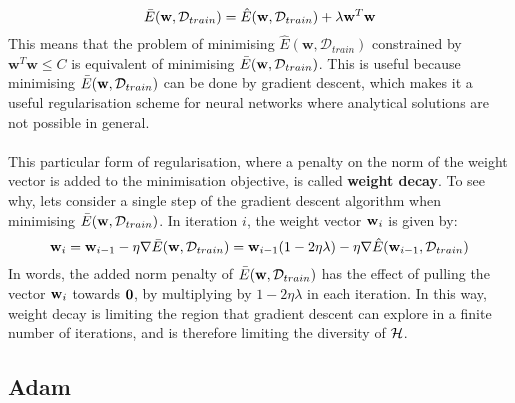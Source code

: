 $$
\bar{E}(\mathbf{w}, \mathcal{D}_{train}) = \hat{E}(\mathbf{w}, \mathcal{D}_{train}) + \lambda\mathbf{w}^T\mathbf{w}
$$
This means that the problem of minimising $\hat{E}(\mathbf{w}, \mathcal{D}_{train})$ constrained by $\mathbf{w}^T\mathbf{w} \leq C$ is equivalent of minimising $\bar{E}(\mathbf{w}, \mathcal{D}_{train})$. This is useful because minimising $\bar{E}(\mathbf{w}, \mathcal{D}_{train})$ can be done by gradient descent, which makes it a useful regularisation scheme for neural networks where analytical solutions are not possible in general.
\\\\
This particular form of regularisation, where a penalty on the norm of the weight vector is added to the minimisation objective, is called \textbf{weight decay}. To see why, lets consider a single step of the gradient descent algorithm when minimising $\bar{E}(\mathbf{w}, \mathcal{D}_{train})$. In iteration $i$, the weight vector $\mathbf{w}_i$ is given by:
$$
\mathbf{w}_i = \mathbf{w}_{i-1} - \eta \nabla \bar{E}(\mathbf{w}, \mathcal{D}_{train}) = \mathbf{w}_{i-1}(1 - 2\eta\lambda) - \eta \nabla \hat{E}(\mathbf{w}_{i-1}, \mathcal{D}_{train})	
$$
In words, the added norm penalty of $\bar{E}(\mathbf{w}, \mathcal{D}_{train})$ has the effect of pulling the vector $\mathbf{w}_i$ towards $\mathbf{0}$, by multiplying by $1 - 2\eta\lambda$ in each iteration. In this way, weight decay is limiting the region that gradient descent can explore in a finite number of iterations, and is therefore limiting the diversity of $\mathcal{H}$.
\label{early_stopping}
\subsection{Adam}
\label{adam} 	